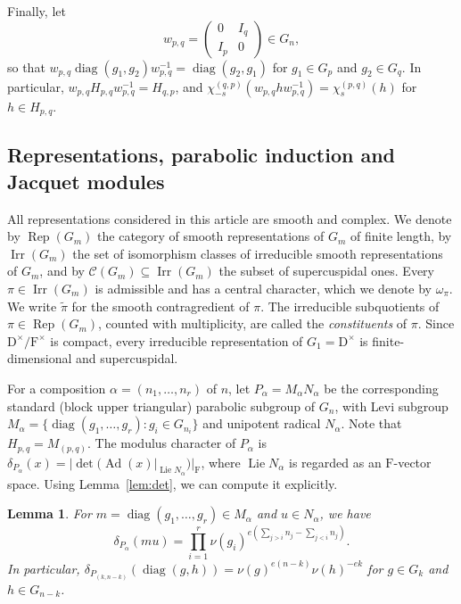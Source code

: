\documentclass[11pt]{amsart}
\numberwithin{equation}{section}
\theoremstyle{plain}
\newtheorem{lemma}[theorem]{Lemma}
\theoremstyle{definition}
\theoremstyle{remark}
\DeclareMathOperator{\Irr}{Irr}
\DeclareMathOperator{\Rep}{Rep}
\DeclareMathOperator{\Lie}{Lie}
\DeclareMathOperator{\diag}{diag}
\DeclareMathOperator{\Ad}{Ad}
\begin{document}
Finally, let
$$
w_{p,q}=\begin{pmatrix}0&I_q\\ I_p&0\end{pmatrix}\in G_n,
$$
so that $w_{p,q}\diag(g_1,g_2)w_{p,q}^{-1}=\diag(g_2,g_1)$ for $g_1\in G_p$ and $g_2\in G_q$. In particular, $w_{p,q}H_{p,q}w_{p,q}^{-1}=H_{q,p}$, and $\chi^{(q,p)}_{-s}(w_{p,q}hw_{p,q}^{-1})=\chi^{(p,q)}_s(h)$ for $h\in H_{p,q}$.

\subsection{Representations, parabolic induction and Jacquet modules}\label{ss:reps}

All representations considered in this article are smooth and complex. We denote by $\Rep(G_m)$ the category of smooth representations of $G_m$ of finite length, by $\Irr(G_m)$ the set of isomorphism classes of irreducible smooth representations of $G_m$, and by $\mathcal{C}(G_m)\subseteq\Irr(G_m)$ the subset of supercuspidal ones. Every $\pi\in\Irr(G_m)$ is admissible and has a central character, which we denote by $\omega_\pi$. We write $\widetilde\pi$ for the smooth contragredient of $\pi$. The irreducible subquotients of $\pi\in\Rep(G_m)$, counted with multiplicity, are called the \emph{constituents} of $\pi$. Since $\mathrm{D}^\times/\mathrm{F}^\times$ is compact, every irreducible representation of $G_1=\mathrm{D}^\times$ is finite-dimensional and supercuspidal.

For a composition $\alpha=(n_1,\dots,n_r)$ of $n$, let $P_\alpha=M_\alpha N_\alpha$ be the corresponding standard (block upper triangular) parabolic subgroup of $G_n$, with Levi subgroup $M_\alpha=\{\diag(g_1,\dots,g_r):g_i\in G_{n_i}\}$ and unipotent radical $N_\alpha$. Note that $H_{p,q}=M_{(p,q)}$. The modulus character of $P_\alpha$ is $\delta_{P_\alpha}(x)=|\det(\Ad(x)|_{\Lie N_\alpha})|_{\mathrm{F}}$, where $\Lie N_\alpha$ is regarded as an $\mathrm{F}$-vector space. Using Lemma~\ref{lem:det}, we can compute it explicitly.

\begin{lemma}\label{lem:modulus}
	For $m=\diag(g_1,\dots,g_r)\in M_\alpha$ and $u\in N_\alpha$, we have
	$$
	\delta_{P_\alpha}(mu)=\prod_{i=1}^r\nu(g_i)^{e\left(\sum_{j>i}n_j-\sum_{j<i}n_j\right)}.
	$$
	In particular, $\delta_{P_{(k,n-k)}}(\diag(g,h))=\nu(g)^{e(n-k)}\nu(h)^{-ek}$ for $g\in G_k$ and $h\in G_{n-k}$.
\end{lemma}
\end{document}
